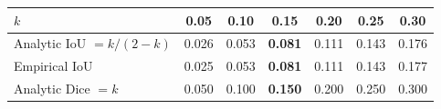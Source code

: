 \begin{tabular}{lcccccc}
\toprule
\textbf{$k$} & 0.05 & 0.10 & \textbf{0.15} & 0.20 & 0.25 & 0.30 \\
\midrule
Analytic IoU $= k/(2-k)$ & 0.026 & 0.053 & \textbf{0.081} & 0.111 & 0.143 & 0.176 \\
Empirical IoU & 0.025 & 0.053 & \textbf{0.081} & 0.111 & 0.143 & 0.177 \\
Analytic Dice $= k$ & 0.050 & 0.100 & \textbf{0.150} & 0.200 & 0.250 & 0.300 \\
\bottomrule
\end{tabular}
